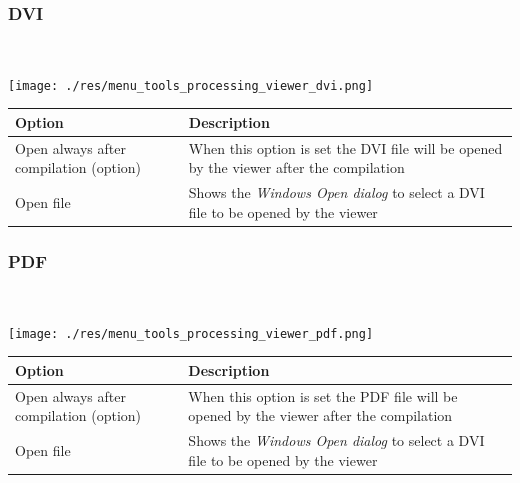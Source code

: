\hypertarget{menu_tools_processing_viewer_DVI}{}
\subsubsection{DVI}\\

\texttt{[image: ./res/menu\_tools\_processing\_viewer\_dvi.png]}\\

\begin{scriptsize}
  \begin{tabularx}{\textwidth}{>{\hsize=0.7\hsize}X>{\hsize=0.7\hsize}X}\\
    \hline
    \textbf{Option} & \textbf{Description} \\
    \hline
    Open always after compilation (option) & When this option is set the DVI file will be opened by the viewer after the compilation \\
    Open file & Shows the \textit{Windows Open dialog} to select a DVI file to be opened by the viewer \\
    \hline
  \end{tabularx}
\end{scriptsize}


\hypertarget{menu_tools_processing_viewer_pdf}{}
\subsubsection{PDF}\\

\texttt{[image: ./res/menu\_tools\_processing\_viewer\_pdf.png]}\\

\begin{scriptsize}
  \begin{tabularx}{\textwidth}{>{\hsize=0.7\hsize}X>{\hsize=0.7\hsize}X}\\
    \hline
    \textbf{Option} & \textbf{Description} \\
    \hline
    Open always after compilation (option) & When this option is set the PDF file will be opened by the viewer after the compilation \\
    Open file & Shows the \textit{Windows Open dialog} to select a DVI file to be opened by the viewer \\
    \hline
  \end{tabularx}
\end{scriptsize}



